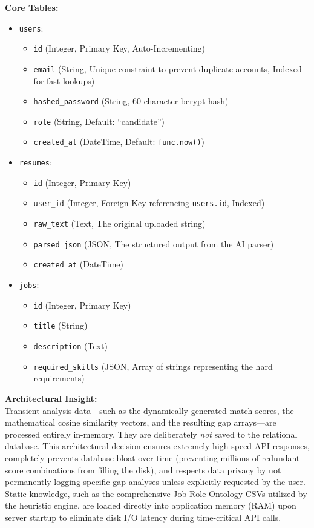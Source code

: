 \documentclass[12pt,a4paper]{report}
\begin{document}
\textbf{Core Tables:}
\begin{itemize}
    \item \texttt{users}: 
      \begin{itemize}
          \item \texttt{id} (Integer, Primary Key, Auto-Incrementing)
          \item \texttt{email} (String, Unique constraint to prevent duplicate accounts, Indexed for fast lookups)
          \item \texttt{hashed\_password} (String, 60-character bcrypt hash)
          \item \texttt{role} (String, Default: ``candidate'')
          \item \texttt{created\_at} (DateTime, Default: \texttt{func.now()})
      \end{itemize}
    \item \texttt{resumes}: 
      \begin{itemize}
          \item \texttt{id} (Integer, Primary Key)
          \item \texttt{user\_id} (Integer, Foreign Key referencing \texttt{users.id}, Indexed)
          \item \texttt{raw\_text} (Text, The original uploaded string)
          \item \texttt{parsed\_json} (JSON, The structured output from the AI parser)
          \item \texttt{created\_at} (DateTime)
      \end{itemize}
    \item \texttt{jobs}: 
      \begin{itemize}
          \item \texttt{id} (Integer, Primary Key)
          \item \texttt{title} (String)
          \item \texttt{description} (Text)
          \item \texttt{required\_skills} (JSON, Array of strings representing the hard requirements)
      \end{itemize}
\end{itemize}

\textbf{Architectural Insight:}\\
Transient analysis data---such as the dynamically generated match scores, the mathematical cosine similarity vectors, and the resulting gap arrays---are processed entirely in-memory. They are deliberately \textit{not} saved to the relational database. This architectural decision ensures extremely high-speed API responses, completely prevents database bloat over time (preventing millions of redundant score combinations from filling the disk), and respects data privacy by not permanently logging specific gap analyses unless explicitly requested by the user. Static knowledge, such as the comprehensive Job Role Ontology CSVs utilized by the heuristic engine, are loaded directly into application memory (RAM) upon server startup to eliminate disk I/O latency during time-critical API calls.
\end{document}
